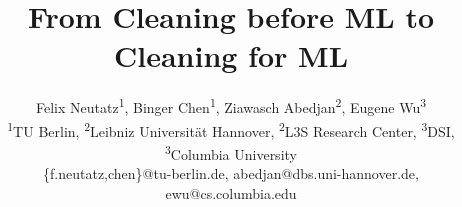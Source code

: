 \documentclass[11pt,dvipsnames]{article}
\begin{document}
\title{From Cleaning before ML to Cleaning for ML}

\author{
  Felix Neutatz\textsuperscript{1}, Binger Chen\textsuperscript{1}, Ziawasch Abedjan\textsuperscript{2}, Eugene Wu\textsuperscript{3}\\
  \textsuperscript{1}TU Berlin, \textsuperscript{2}Leibniz Universität Hannover, \textsuperscript{2}L3S Research Center, \textsuperscript{3}DSI, \textsuperscript{3}Columbia University\\
  \{f.neutatz,chen\}@tu-berlin.de, abedjan@dbs.uni-hannover.de, ewu@cs.columbia.edu
}



\maketitle

\newcommand{\ziawasch}[1]{\textcolor{blue}{Ziawasch: #1}}
\newcommand{\Felix}[1]{\textcolor{purple}{Felix: #1}}
\newcommand{\Binger}[1]{\textcolor{red}{Binger: #1}}
\newcommand{\Eugene}[1]{\textcolor{blue}{Eugene: #1}}
\newcommand{\ewu}[1]{\textcolor{red}{ewu: #1}}
\newcommand{\todo}[1]{\textcolor{red}{TODO #1}}
\newcommand{\stitle}[1]{\vspace{0.8ex}\noindent{\bf #1}}
\newcommand{\system}{\textsc{CycleClean}}


\newcommand{\smallestfont}{\scriptsize}
\end{document}
